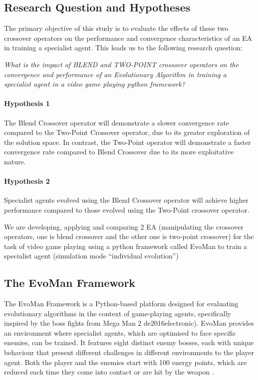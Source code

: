 \subsection{Research Question and Hypotheses}
The primary objective of this study is to evaluate the effects of these two crossover operators on the performance and convergence characteristics of an EA in training a specialist agent.
This leads us to the following research question:

\textit{What is the impact of BLEND and TWO-POINT crossover operators on the convergence and performance of an Evolutionary Algorithm in training a specialist agent in a video game playing python framework?}

\paragraph{Hypothesis 1}
The Blend Crossover operator will demonstrate a slower convergence rate compared to the Two-Point Crossover operator, due to its greater exploration of the solution space. In contrast, the Two-Point operator will demonstrate a faster convergence rate compared to Blend Crossover due to its more exploitative nature.
\paragraph{Hypothesis 2}
Specialist agents evolved using the Blend Crossover operator will achieve higher performance compared to those evolved using the Two-Point crossover operator.

We are developing, applying and comparing 2 EA (manipulating the crossover operators, one is blend crossover and the other one is two-point crossover) for the task of video game playing using a python framework called EvoMan to train a specialist agent (simulation mode “individual evolution”)

\subsection{The EvoMan Framework}
The EvoMan Framework is a Python-based platform designed for evaluating evolutionary algorithms in the context of game-playing agents, specifically inspired by the boss fights from Mega Man 2 de2016electronic).
EvoMan provides an environment where specialist agents, which are optimised to face specific enemies, can be trained.
It features eight distinct enemy bosses, each with unique behaviour that present different challenges in different environments to the player agent.
Both the player and the enemies start with 100 energy points, which are reduced each time they come into contact or are hit by the weapon \cite{2016evoman}.

